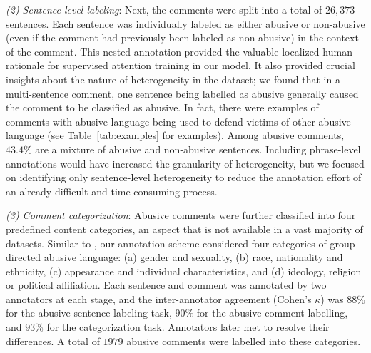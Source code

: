 \documentclass[letterpaper]{article} %
\begin{document}
\textit{(2) Sentence-level labeling}: Next, the comments were split into a total of $26,373$ sentences. Each sentence was individually labeled as either abusive or non-abusive (even if the comment had previously been labeled as non-abusive) in the context of the comment. This nested annotation provided the valuable localized human rationale for supervised attention training in our model.
It also provided crucial insights about the nature of heterogeneity in the dataset; we found that in a multi-sentence comment, one sentence being labelled as abusive generally caused the  comment to be classified as abusive.
In fact, there were examples of comments with abusive language being used to defend victims of other abusive language (see Table~\ref{tab:examples} for examples). Among abusive comments, $43.4\%$ are a mixture of abusive and non-abusive sentences.
Including phrase-level annotations would have increased the granularity of heterogeneity, but we focused on identifying only sentence-level heterogeneity to reduce the annotation effort of an already difficult and time-consuming process.

\textit{(3) Comment categorization}: Abusive comments were further classified into four predefined  content categories, an aspect that is not available in a vast majority of  datasets.  Similar to \cite{founta2018large}, our annotation scheme considered four categories of group-directed abusive language: (a) gender and sexuality, (b) race, nationality and ethnicity, (c) appearance and individual characteristics, and (d) ideology, religion or political affiliation.
Each sentence and comment was annotated by two annotators at each stage, and the inter-annotator agreement (Cohen's $\kappa$) was $88\%$ for the abusive sentence labeling task, $90\%$ for the abusive comment labelling, and $93\%$ for the categorization task. Annotators later met to resolve their differences. A total of $1979$ abusive comments were labelled into these categories.
\end{document}
